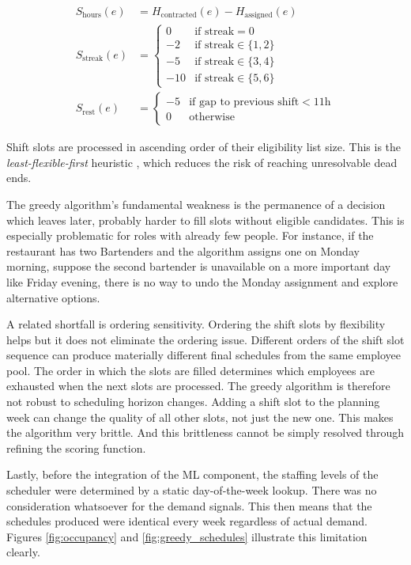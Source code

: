 \documentclass[12pt,a4paper,oneside]{article}
\begin{document}
\begin{align}
S_{\text{hours}}(e) &= H_{\text{contracted}}(e) - H_{\text{assigned}}(e) \label{eq:score_hours} \\
S_{\text{streak}}(e) &= \begin{cases} 0 & \text{if streak} = 0 \\ -2 & \text{if streak} \in \{1,2\} \\ -5 & \text{if streak} \in \{3,4\} \\ -10 & \text{if streak} \in \{5,6\} \end{cases} \label{eq:score_streak} \\
S_{\text{rest}}(e) &= \begin{cases} -5 & \text{if gap to previous shift} < 11\text{h} \\ 0 & \text{otherwise} \end{cases} \label{eq:score_rest}
\end{align}

Shift slots are processed in ascending order of their eligibility list size. This is the \textit{least-flexible-first} heuristic \citep{rossi2006}, which reduces the risk of reaching unresolvable dead ends.

 The greedy algorithm's fundamental weakness is the permanence of a decision which leaves later, probably harder to fill slots without eligible candidates. This is especially problematic for roles with already few people. For instance, if the restaurant has two Bartenders and the algorithm assigns one on Monday morning,
 suppose the second bartender is unavailable on a more important day like Friday evening, there is no way to undo the Monday assignment and explore alternative options.
 

A related shortfall is ordering sensitivity. Ordering the shift slots by flexibility helps but it does not eliminate the ordering issue. Different orders of the shift slot sequence can produce materially different final schedules from the same employee pool. The order in which the slots are filled determines which employees are exhausted when the next slots are processed. The greedy algorithm is therefore not robust to scheduling horizon changes. Adding a shift slot to the planning week can change the quality of all other slots, not just the new one. This makes the algorithm very brittle. And this brittleness cannot be simply resolved through refining the scoring function.

Lastly, before the integration of the ML component, the staffing levels of the scheduler were determined by a static day-of-the-week lookup. There was no consideration whatsoever for the demand signals. This then means that the schedules produced were identical every week regardless of actual demand. Figures \ref{fig:occupancy} and \ref{fig:greedy_schedules} illustrate this limitation clearly.
\end{document}
